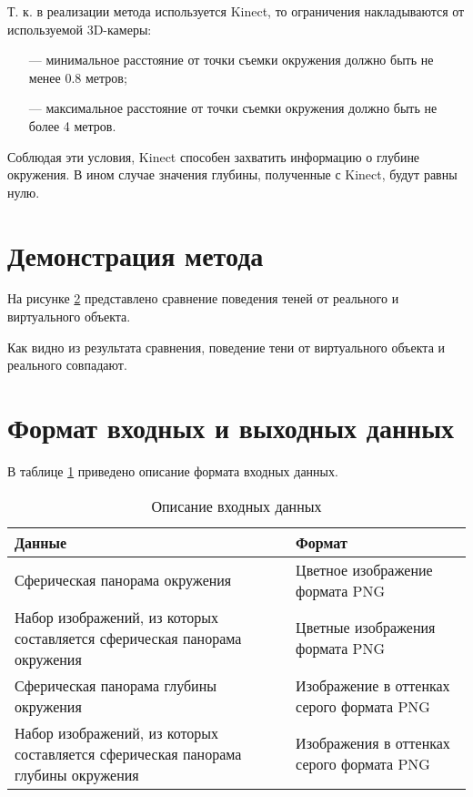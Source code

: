 Т. к. в реализации метода используется Kinect, то ограничения накладываются от используемой 3D-камеры:

\begin{itemize}
	\item[---] минимальное расстояние от точки съемки окружения должно быть не менее 0.8 метров;
	\item[---] максимальное расстояние от точки съемки окружения должно быть не более 4 метров.
\end{itemize}

Соблюдая эти условия, Kinect способен захватить информацию о глубине окружения. В ином случае значения глубины, полученные с Kinect, будут равны нулю.

\section{Демонстрация метода}

На рисунке \ref{} представлено сравнение поведения теней от реального и виртуального объекта.



Как видно из результата сравнения, поведение тени от виртуального объекта и реального совпадают.

\section{Формат входных и выходных данных}

В таблице \ref{FormatData} приведено описание формата входных данных.

\begin{table}[H]
	\caption{Описание входных данных}
	\label{FormatData}
	\begin{center}
		\begin{tabular}{| p{6 cm} | p{9 cm} |} 
			\hline
			Данные & Формат \\
			\hline
			Сферическая панорама окружения & Цветное изображение формата PNG \\
			\hline
			Набор изображений, из которых составляется сферическая панорама окружения & Цветные изображения формата PNG \\
			\hline
			Сферическая панорама глубины окружения & Изображение в оттенках серого формата PNG \\
			\hline
			Набор изображений, из которых составляется сферическая панорама глубины окружения & Изображения в оттенках серого формата PNG \\
			\hline
		\end{tabular}
	\end{center}
\end{table}

